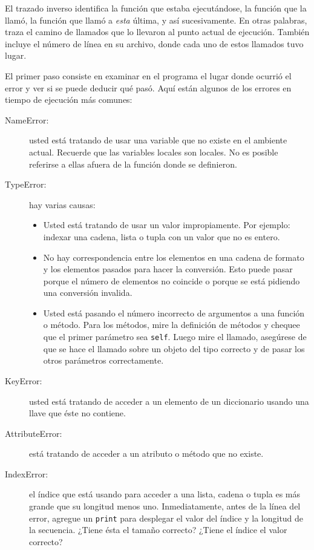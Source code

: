 
El trazado inverso identifica la función que estaba ejecutándose,
la función que la llamó, la función que llamó a {\em esta} última,
y así sucesivamente. En otras palabras, traza el camino de llamados
que lo llevaron al punto actual de ejecución. También incluye el número
de línea en su archivo, donde cada uno de estos llamados tuvo lugar.

El primer paso consiste en examinar en el programa el lugar donde
ocurrió el error y ver si se puede deducir qué pasó. Aquí están algunos
de los errores en tiempo de ejecución más comunes:
\begin{description}
\item [{NameError:}] usted está tratando de usar una variable que no existe
en el ambiente actual. Recuerde que las variables locales son locales.
No es posible referirse a ellas afuera de la función donde se definieron.

 
\item [{TypeError:}] hay varias causas:

\begin{itemize}
\item Usted está tratando de usar un valor impropiamente. Por ejemplo: indexar
una cadena, lista o tupla con un valor que no es entero.

\item No hay correspondencia entre los elementos en una cadena de formato
y los elementos pasados para hacer la conversión. Esto puede pasar
porque el número de elementos no coincide o porque se está pidiendo
una conversión invalida.

 
\item Usted está pasando el número incorrecto de argumentos a una función
o método. Para los métodos, mire la definición de métodos y chequee
que el primer parámetro sea \texttt{self}. Luego mire el llamado,
asegúrese de que se hace el llamado sobre un objeto del tipo correcto
y de pasar los otros parámetros correctamente.
\end{itemize}
\item [{KeyError:}] usted está tratando de acceder a un elemento de un
diccionario usando una llave que éste no contiene.

 
\item [{AttributeError:}] está tratando de acceder a un atributo o método
que no existe.

\item [{IndexError:}] el índice que está usando para acceder a una lista,
cadena o tupla es más grande que su longitud menos uno. Inmediatamente,
antes de la línea del error, agregue un \texttt{print} para desplegar
el valor del índice y la longitud de la secuencia. ¿Tiene ésta el
tamaño correcto? ¿Tiene el índice el valor correcto?

\end{description}

